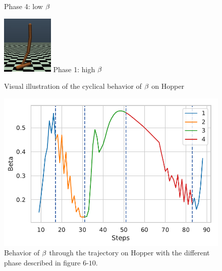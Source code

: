 \begin{figure}[h]
\begin{minipage}[b]{0.18\linewidth}
     Phase 4: low $\beta$
    \label{fig:phase_3}
    \end{minipage}
    \hspace{0.02cm}
    \begin{minipage}[b]{0.18\linewidth}
    \centering
    \includegraphics[width=\textwidth,height=2.8cm]{fig/phase_4.png}
    Phase 1: high $\beta$
    \label{fig:phase_4}
    \end{minipage}
    \caption{Visual illustration of the cyclical behavior of $\beta$ on Hopper}
    \label{fig:visual_hopper}
\end{figure}


\begin{figure}[!h]
    \centering
    \includegraphics[scale=0.5]{fig/beta_hopper.pdf}
    \caption{Behavior of $\beta$ through the trajectory on Hopper with the different phase described in figure $6$-$10$.}
    \label{fig:cyle_hopper}
\end{figure}

